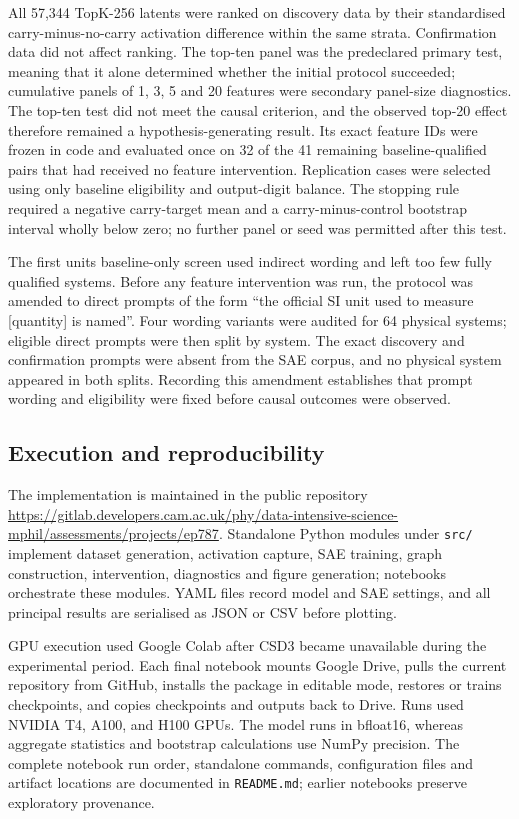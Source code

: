 \documentclass[11pt,a4paper]{article}
\newcommand{\code}[1]{\nolinkurl{#1}}
\begin{document}
    All 57,344 TopK-256 latents were ranked on discovery data by their standardised carry-minus-no-carry activation difference within the same strata. Confirmation data did not affect ranking. The top-ten panel was the predeclared primary test, meaning that it alone determined whether the initial protocol succeeded; cumulative panels of 1, 3, 5 and 20 features were secondary panel-size diagnostics. The top-ten test did not meet the causal criterion, and the observed top-20 effect therefore remained a hypothesis-generating result. Its exact feature IDs were frozen in code and evaluated once on 32 of the 41 remaining baseline-qualified pairs that had received no feature intervention. Replication cases were selected using only baseline eligibility and output-digit balance. The stopping rule required a negative carry-target mean and a carry-minus-control bootstrap interval wholly below zero; no further panel or seed was permitted after this test.

    The first units baseline-only screen used indirect wording and left too few fully qualified systems. Before any feature intervention was run, the protocol was amended to direct prompts of the form ``the official SI unit used to measure [quantity] is named''. Four wording variants were audited for 64 physical systems; eligible direct prompts were then split by system. The exact discovery and confirmation prompts were absent from the SAE corpus, and no physical system appeared in both splits. Recording this amendment establishes that prompt wording and eligibility were fixed before causal outcomes were observed.

\subsection{Execution and reproducibility}

    The implementation is maintained in the public repository \url{https://gitlab.developers.cam.ac.uk/phy/data-intensive-science-mphil/assessments/projects/ep787}. Standalone Python modules under \code{src/} implement dataset generation, activation capture, SAE training, graph construction, intervention, diagnostics and figure generation; notebooks orchestrate these modules. YAML files record model and SAE settings, and all principal results are serialised as JSON or CSV before plotting.

    GPU execution used Google Colab after CSD3 became unavailable during the experimental period. Each final notebook mounts Google Drive, pulls the current repository from GitHub, installs the package in editable mode, restores or trains checkpoints, and copies checkpoints and outputs back to Drive. Runs used NVIDIA T4, A100, and H100 GPUs. The model runs in bfloat16, whereas aggregate statistics and bootstrap calculations use NumPy precision. The complete notebook run order, standalone commands, configuration files and artifact locations are documented in \code{README.md}; earlier notebooks preserve exploratory provenance.
\end{document}

